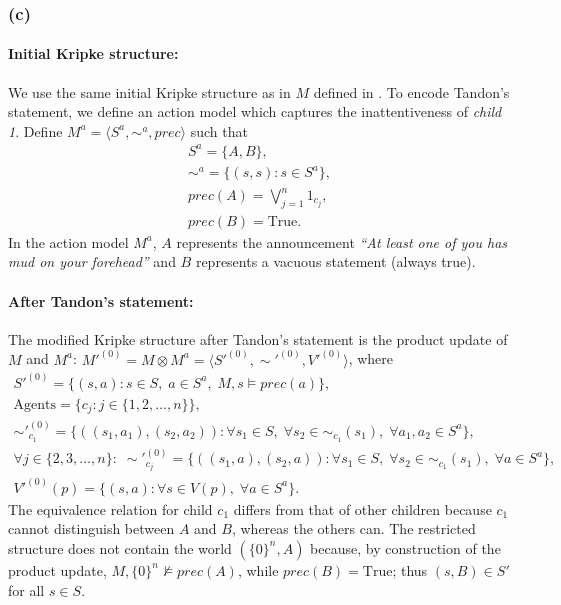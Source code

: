 \subsubsection*{(c)}

\paragraph*{Initial Kripke structure:} 
We use the same initial Kripke structure as in $M$ defined in .
To encode Tandon's statement, we define an action model which
captures the inattentiveness of \emph{child 1}. 
Define \( M^{a}= \langle S^{a},\sim^{a},prec \rangle \) such that
\begin{gather*}
    S^{a} = \{A,B\}, \\
    \sim^{a} = \{(s,s) : s \in S^{a}\}, \\
    prec(A) = \bigvee_{j=1}^{n} 1_{c_j}, \\
    prec(B) = \text{True}.
\end{gather*}
In the action model $M^{a}$, $A$ represents the announcement 
\emph{``At least one of you has mud on your forehead''} and 
$B$ represents a vacuous statement (always true).

\paragraph*{After Tandon's statement:}
The modified Kripke structure after Tandon's statement
is the product update of $M$ and $M^a$:
$M'^{(0)} = M \otimes M^a = \langle S'^{(0)},\sim'^{(0)},V'^{(0)} \rangle$,
where
\begin{gather*}
    S'^{(0)} = \{ (s,a) : s \in S,\; a \in S^a,\; M,s \models prec(a) \}, \\
    \text{Agents} = \{c_j : j \in \{1,2,\dots,n\}\}, \\
    \sim'^{(0)}_{c_1} = \{ ((s_1,a_1),(s_2,a_2)) : 
        \forall s_1 \in S,\; \forall s_2 \in \sim_{c_1}(s_1),\;
        \forall a_1,a_2 \in S^a \}, \tag{1.2(c1)}\label{eq:1.2(c1)}\\
    \forall j \in \{2,3,\dots,n\}:\;
        \sim'^{(0)}_{c_j} = \{ ((s_1,a),(s_2,a)) :
            \forall s_1 \in S,\; \forall s_2 \in \sim_{c_1}(s_1),\;
            \forall a \in S^a \}, \tag{1.2(c2)}\label{eq:1.2(c2)}\\
    V'^{(0)}(p) = \{ (s,a) : \forall s \in V(p),\; \forall a \in S^a \}.
\end{gather*}
The equivalence relation for child $c_1$ differs from 
that of other children because $c_1$ cannot distinguish 
between $A$ and $B$, whereas the others can.
The restricted structure does not contain the world $(\{0\}^n,A)$ 
because, by construction of the product update, 
$M, \{0\}^n \not\models prec(A)$, while $prec(B)=\text{True}$; 
thus $(s,B) \in S'$ for all $s \in S$.

